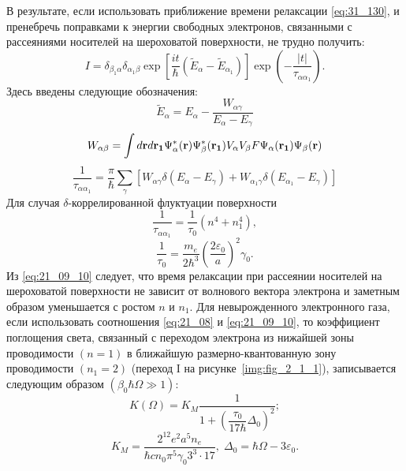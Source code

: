 В результате, если использовать приближение времени релаксации \eqref{eq:31_130}, и пренебречь поправками к энергии свободных электронов, связанными с рассеяниями носителей на шероховатой поверхности, не трудно получить:
\begin{equation} \label{eq:21_09_08}
I = \delta_{\beta_1\alpha} \delta_{\alpha_1\beta} \exp{\left[\frac{it}{\hbar} \left(\widetilde{E}_{\alpha} - \widetilde{E}_{\alpha_1} \right)  \right] } \exp{\left(- \frac{|t|}{\tau_{\alpha\alpha_1}} \right)}.
\end{equation}
Здесь введены следующие обозначения:
\[
\widetilde{E}_{\alpha} = E_{\alpha} - \frac{W_{\alpha \gamma}}{E_{\alpha} - E_{\gamma}}
\]
\[
W_{\alpha\beta}=\int{d\boldsymbol{\mathbf{r}} d\boldsymbol{\mathbf{r_1}} \Psi^*_\alpha(\boldsymbol{\mathbf{r}}) \Psi^*_\beta(\boldsymbol{\mathbf{r_1}}) V_\alpha V_\beta F \Psi_\alpha(\boldsymbol{\mathbf{r_1}}) \Psi_\beta(\boldsymbol{\mathbf{r}})}
\]
\[
\frac{1}{\tau_{\alpha\alpha_1}} = \frac{\pi}{\hbar} \sum_{\gamma } { \left[W_{\alpha \gamma }\delta \left(E_{\alpha} - E_{\gamma}\right) + W_{\alpha_1 \gamma }\delta \left(E_{\alpha_1} - E_{\gamma}\right) \right] }
\]
Для случая $\delta$-коррелированной флуктуации поверхности
\begin{equation} \label{eq:21_09_10}
\frac{1}{\tau_{\alpha\alpha_1}} = \frac{1}{\tau_0} \left(n^4 + n_1^4 \right) ,
\end{equation}
\[
\frac{1}{\tau_0}  = \frac{m_e}{2\hbar^3} \left(\frac{2\varepsilon_0}{a} \right)^2 \gamma_0. 
\]
Из \eqref{eq:21_09_10} следует, что время релаксации при рассеянии носителей на шероховатой поверхности не зависит от волнового вектора электрона и заметным образом уменьшается с ростом $n$ и $n_1$. Для невырожденного электронного газа, если использовать соотношения \eqref{eq:21_08} и \eqref{eq:21_09_10}, то коэффициент поглощения света, связанный с переходом электрона из нижайшей зоны проводимости $(n=1)$ в ближайшую размерно-квантованную зону проводимости $(n_1=2)$ (переход I на рисунке~\ref{img:fig_2_1_1}), записывается следующим образом $(\beta _0\hbar \Omega \gg 1)$:
\begin{equation} \label{eq:21_10}
K(\Omega) = K_M \frac{1}{1+\left(\dfrac{\tau_0 }{17 \hbar} \Delta_0 \right)^2 } ;
\end{equation} 
\[
K_M =\frac{2^{12} e^2 a^5 n_e }{\hbar cn_0 \pi^5 \gamma_0 3^3 \cdot 17}, \;
\Delta_0 =\hbar \Omega -3\varepsilon_0.
\]
